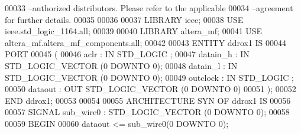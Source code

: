 \begin{DoxyCode}
{00033 \textcolor{keyword}{--authorized distributors.  Please refer to the applicable }
00034 \textcolor{keyword}{--agreement for further details.}
00035 
00036 
00037 \textcolor{vhdlkeyword}{LIBRARY }\textcolor{keywordflow}{ieee};
00038 \textcolor{vhdlkeyword}{USE }ieee.std\_logic\_1164.\textcolor{keywordflow}{all};
00039 
00040 \textcolor{vhdlkeyword}{LIBRARY }\textcolor{keywordflow}{altera\_mf};
00041 \textcolor{vhdlkeyword}{USE }altera\_mf.altera\_mf\_components.\textcolor{keywordflow}{all};
00042 
00043 \textcolor{keywordflow}{ENTITY }ddrox1 \textcolor{keywordflow}{IS}
00044     \textcolor{keywordflow}{PORT}
00045     \textcolor{vhdlchar}{(}
00046         \textcolor{vhdlchar}{aclr}        \textcolor{vhdlchar}{:} \textcolor{keywordflow}{IN} \textcolor{comment}{STD\_LOGIC} ;
00047         \textcolor{vhdlchar}{datain_h}        \textcolor{vhdlchar}{:} \textcolor{keywordflow}{IN} \textcolor{comment}{STD\_LOGIC\_VECTOR} \textcolor{vhdlchar}{(}\textcolor{vhdllogic}{}\textcolor{vhdllogic}{0} \textcolor{keywordflow}{DOWNTO} \textcolor{vhdllogic}{}\textcolor{vhdllogic}{0}\textcolor{vhdlchar}{)};
00048         \textcolor{vhdlchar}{datain_l}        \textcolor{vhdlchar}{:} \textcolor{keywordflow}{IN} \textcolor{comment}{STD\_LOGIC\_VECTOR} \textcolor{vhdlchar}{(}\textcolor{vhdllogic}{}\textcolor{vhdllogic}{0} \textcolor{keywordflow}{DOWNTO} \textcolor{vhdllogic}{}\textcolor{vhdllogic}{0}\textcolor{vhdlchar}{)};
00049         \textcolor{vhdlchar}{outclock}        \textcolor{vhdlchar}{:} \textcolor{keywordflow}{IN} \textcolor{comment}{STD\_LOGIC} ;
00050         \textcolor{vhdlchar}{dataout}     \textcolor{vhdlchar}{:} \textcolor{keywordflow}{OUT} \textcolor{comment}{STD\_LOGIC\_VECTOR} \textcolor{vhdlchar}{(}\textcolor{vhdllogic}{}\textcolor{vhdllogic}{0} \textcolor{keywordflow}{DOWNTO} \textcolor{vhdllogic}{}\textcolor{vhdllogic}{0}\textcolor{vhdlchar}{)}
00051     \textcolor{vhdlchar}{)};
00052 \textcolor{keywordflow}{END} \textcolor{vhdlchar}{ddrox1};
00053 
00054 
00055 \textcolor{keywordflow}{ARCHITECTURE} SYN \textcolor{keywordflow}{OF} ddrox1 IS
00056 
00057     \textcolor{keywordflow}{SIGNAL} \textcolor{vhdlchar}{sub_wire0}    \textcolor{vhdlchar}{:} \textcolor{comment}{STD\_LOGIC\_VECTOR} \textcolor{vhdlchar}{(}\textcolor{vhdllogic}{}\textcolor{vhdllogic}{0} \textcolor{keywordflow}{DOWNTO} \textcolor{vhdllogic}{}\textcolor{vhdllogic}{0}\textcolor{vhdlchar}{)};
00058 
00059 \textcolor{vhdlkeyword}{BEGIN}
00060     \textcolor{vhdlchar}{dataout}    \textcolor{vhdlchar}{<=} \textcolor{vhdlchar}{sub_wire0}\textcolor{vhdlchar}{(}\textcolor{vhdllogic}{}\textcolor{vhdllogic}{0} \textcolor{keywordflow}{DOWNTO} \textcolor{vhdllogic}{}\textcolor{vhdllogic}{0}\textcolor{vhdlchar}{)};
}
\end{DoxyCode}

